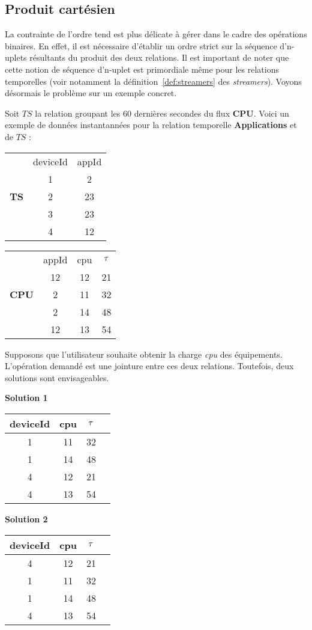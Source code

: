 \subsection{Produit cartésien}
La contrainte de l'ordre tend est plus délicate à gérer dans le cadre des opérations binaires. En effet, il est nécessaire d'établir un ordre strict sur la séquence d'n-uplets résultants du produit des deux relations. Il est important de noter que cette notion de séquence d'n-uplet est primordiale même pour les relations temporelles (voir notamment la définition~\ref{def:streamers} des \textit{streamers}). Voyons désormais le problème sur un exemple concret.
\begin{example}\label{ex:asymetrie}
Soit $TS$ la relation groupant les 60 dernières secondes du flux \textbf{CPU}. Voici un exemple de données instantannées pour la relation temporelle \textbf{Applications} et de $TS$ :
\begin{center}
\begin{tabular}{ccc}
& deviceId & appId \\ %
\cline{2-3} & 1 & 2 \\
\textbf{TS} &2 & 23 \\
&3 & 23 \\
&4 & 12 \\
\end{tabular} \quad \quad \quad
\begin{tabular}{cccc}
& appId & cpu & $\tau$ \\%
\cline{2-4} & 12 & 12 & 21 \\
\textbf{CPU}& 2 & 11 & 32 \\
& 2 & 14 & 48 \\
&12& 13 & 54 \\
\end{tabular}
\end{center}

Supposons que l'utilisateur souhaite obtenir la charge \textit{cpu} des équipements. L'opération demandé est une jointure entre ces deux relations. Toutefois, deux solutions sont envisageables.
\begin{center}
\textbf{Solution 1 }
\begin{tabular}{cccc} 
        deviceId & cpu & $\tau$ \\ \hline 
        1&  11&  32  \\
        1&  14&  48  \\
        4&  12&  21 \\
        4&  13&  54\\
\end{tabular}
\quad \quad \quad\textbf{Solution 2 }
\begin{tabular}{cccc}
        deviceId & cpu & $\tau$ \\ \hline 
        4&  12&  21\\
        1&  11&  32\\
        1&  14&  48\\
        4&  13&  54\\
\end{tabular}
\end{center}


\end{example}
